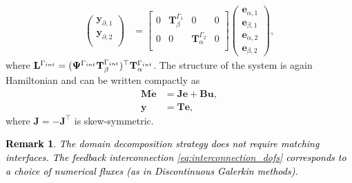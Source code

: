 \documentclass[11pt,a4paper]{article}
\newtheorem{remark}{Remark}
\newcommand{\revone}[1]{{\textcolor{black}{#1}}}
\begin{document}
\begin{equation}
\begin{aligned}
\begin{pmatrix}
            \mathbf{y}_{\partial,1} \\
            \mathbf{y}_{\partial,2} \\
        \end{pmatrix} &= 
        \begin{bmatrix}
            0 & \mathbf{T}_\beta^{\Gamma_1} & 0 & 0 \\
            0 & 0 & \mathbf{T}_\alpha^{\Gamma_2} & 0\\
        \end{bmatrix}
        \begin{pmatrix}
            \mathbf{e}_{\alpha,1} \\
            \mathbf{e}_{\beta,1} \\
            \mathbf{e}_{\alpha,2} \\
            \mathbf{e}_{\beta,2}
        \end{pmatrix},
    \end{aligned}
\label{eq:Monolithic-System}
\end{equation}
where $\mathbf{L}^{\Gamma_{\rm int}} =  (\mathbf{\Psi}^{\Gamma_{\rm int}}\mathbf{T}_\beta^{\Gamma_{\rm int}})^\top \mathbf{T}_\alpha^{\Gamma_{\rm int}}$. The structure of the system is again Hamiltonian and can be written compactly as 
\begin{equation}
\begin{aligned}
    \mathbf{M}\dot{\mathbf{e}} &= \mathbf{J} \mathbf{e} + \mathbf{Bu}, \\
    \mathbf{y} &= \mathbf{T} \mathbf{e}, 
\end{aligned}
\end{equation}
where $\mathbf{J} = - \mathbf{J}^\top$ is skew-symmetric.
\revone{
\begin{remark}
    The domain decomposition strategy does not require matching interfaces. The feedback interconnection \eqref{eq:interconnection_dofs} corresponds to a choice of numerical fluxes (as in Discontinuous Galerkin methods).
\end{remark}
}
\end{document}
